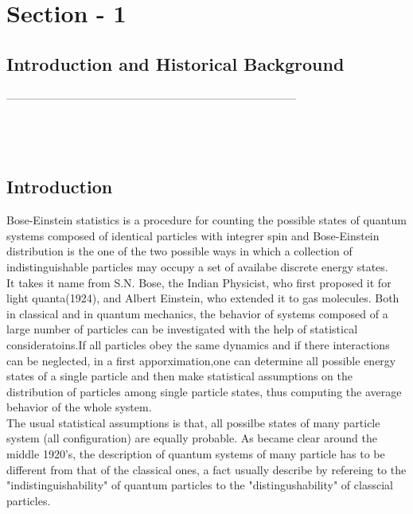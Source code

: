 \documentclass[12pt, letterpaper]{article}
\begin{document}
    \section*{Section - 1}
    \subsection*{Introduction and Historical Background}
    \noindent
    ------------------------------------------------------------------------------ \\ 
    \\
    \\
    \\


    \subsection*{Introduction}
    
    Bose-Einstein statistics is a procedure for counting the possible states of quantum systems composed of identical particles with integrer
    spin and Bose-Einstein distribution is the one of the two possible ways in which a collection of indistinguishable particles may occupy a set 
    of availabe discrete energy states.\\

    It takes it name from S.N. Bose, the Indian Physicist, who first proposed it for light quanta(1924), and Albert Einstein, who extended
    it to gas molecules. Both in classical and in quantum mechanics, the behavior of systems composed of a large number of particles 
    can be investigated with the help of statistical consideratoins.If all particles obey the same dynamics and if there interactions 
    can be neglected, in a first apporximation,one can determine all possible energy states of a single particle and then make statistical
    assumptions on the distribution of particles among single particle states, thus computing the average behavior of the whole system.\\
    
    The usual statistical assumptions is that, all possilbe states of many particle system (all configuration) are equally probable.
    As became clear around the middle 1920's, the description of quantum systems of many particle has to be different from that of the classical
    ones, a fact usually describe by refereing to the "indistinguishability" of quantum particles to the "distingushability" of classcial particles.\\
\end{document}
